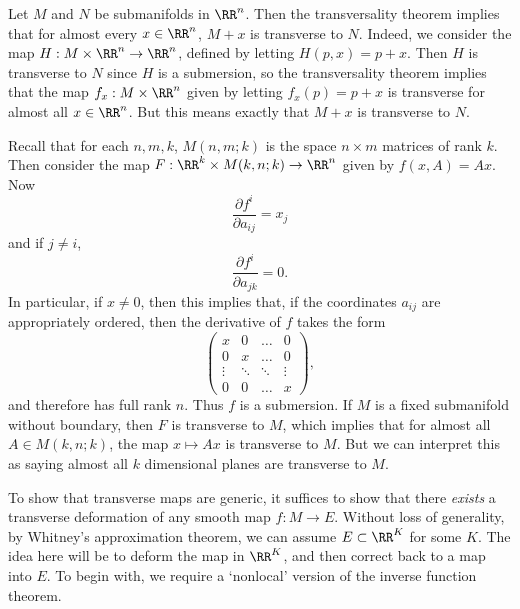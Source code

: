 \begin{example}
    Let $M$ and $N$ be submanifolds in $\RR^n$. Then the transversality theorem implies that for almost every $x \in \RR^n$, $M + x$ is transverse to $N$. Indeed, we consider the map $H: M \times \RR^n \to \RR^n$, defined by letting $H(p,x) = p + x$. Then $H$ is transverse to $N$ since $H$ is a submersion, so the transversality theorem implies that the map $f_x: M \times \RR^n$ given by letting $f_x(p) = p + x$ is transverse for almost all $x \in \RR^n$. But this means exactly that $M + x$ is transverse to $N$.
\end{example}

\begin{example}
    Recall that for each $n,m,k$, $M(n,m;k)$ is the space $n \times m$ matrices of rank $k$. Then consider the map $F: \RR^k \times M(k,n;k) \to \RR^n$ given by $f(x,A) = Ax$. Now
    \[ \frac{\partial f^i}{\partial a_{ij}} = x_j \]
    and if $j \neq i$,
    \[ \frac{\partial f^i}{\partial a_{jk}} = 0. \]
    In particular, if $x \neq 0$, then this implies that, if the coordinates $a_{ij}$ are appropriately ordered, then the derivative of $f$ takes the form
    \[ \begin{pmatrix} x & 0 & \dots & 0 \\ 0 & x & \dots & 0 \\ \vdots & \ddots & \ddots & \vdots \\ 0 & 0 & \dots & x \end{pmatrix}, \]
    and therefore has full rank $n$. Thus $f$ is a submersion. If $M$ is a fixed submanifold without boundary, then $F$ is transverse to $M$, which implies that for almost all $A \in M(k,n;k)$, the map $x \mapsto Ax$ is transverse to $M$. But we can interpret this as saying almost all $k$ dimensional planes are transverse to $M$.
\end{example}

To show that transverse maps are generic, it suffices to show that there \emph{exists} a transverse deformation of any smooth map $f:M \to E$. Without loss of generality, by Whitney's approximation theorem, we can assume $E \subset \RR^K$ for some $K$. The idea here will be to deform the map in $\RR^K$, and then correct back to a map into $E$. To begin with, we require a `nonlocal' version of the inverse function theorem.

